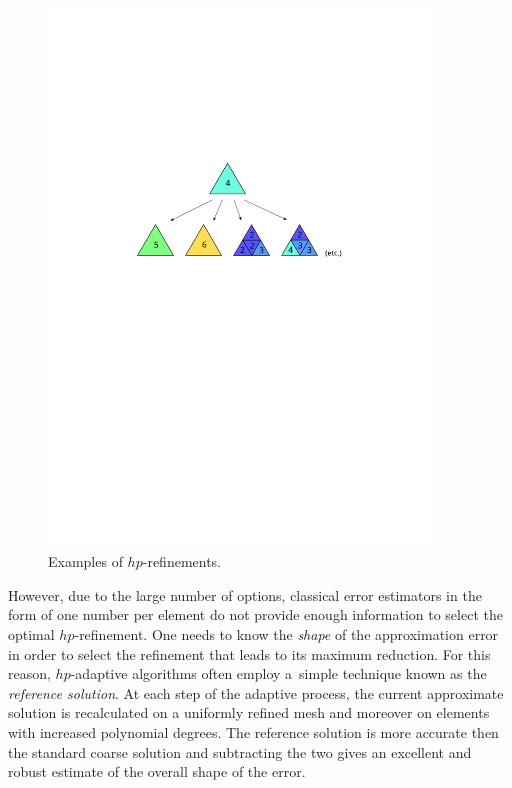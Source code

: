 \begin{figure}[ht]
  \medskip \centering
  \includegraphics[width=0.9\textwidth]{img/refinements}
  \caption{Examples of $hp$-refinements.}
  \label{fig:refinements}
\end{figure}

However, due to the large number of options, classical error estimators in the form of one
number per element do not provide enough information to select the optimal $hp$-refinement.
One needs to know the {\it shape} of the approximation error in order to select the refinement
that leads to its maximum reduction. For this reason, $hp$-adaptive algorithms often employ
a~simple technique known as the {\it reference solution}. At each step of the adaptive process,
the current approximate solution is recalculated on a uniformly refined mesh and moreover
on elements with increased polynomial degrees. The reference solution is more accurate then
the standard coarse solution and subtracting the two gives an excellent and robust estimate
of the overall shape of the error.

